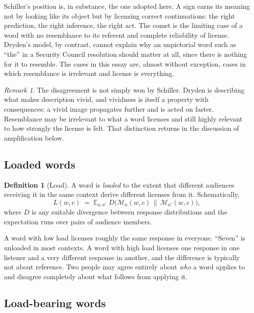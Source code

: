 \documentclass[11pt,a4paper]{article}
\theoremstyle{plain}
\theoremstyle{definition}
\newtheorem{definition}{Definition}
\theoremstyle{remark}
\newtheorem{remark}{Remark}
\newcommand{\M}{\mathcal{M}}
\begin{document}
Schiller's position is, in substance, the one adopted here. A sign earns its meaning not by looking like its object but by licensing correct continuations: the right prediction, the right inference, the right act. The comet is the limiting case of a word with no resemblance to its referent and complete reliability of license. Dryden's model, by contrast, cannot explain why an unpictorial word such as ``the'' in a Security Council resolution should matter at all, since there is nothing for it to resemble. The cases in this essay are, almost without exception, cases in which resemblance is irrelevant and license is everything.

\begin{remark}
The disagreement is not simply won by Schiller. Dryden is describing what makes description vivid, and vividness is itself a property with consequences: a vivid image propagates further and is acted on faster. Resemblance may be irrelevant to what a word licenses and still highly relevant to how strongly the license is felt. That distinction returns in the discussion of amplification below.
\end{remark}

\subsection{Loaded words}

\begin{definition}[Load]
A word is \emph{loaded} to the extent that different audiences receiving it in the same context derive different licenses from it. Schematically,
\[
L(w,c) \;=\; \mathbb{E}_{a,a'}\; D\big(\M_a(w,c)\,\big\|\,\M_{a'}(w,c)\big),
\]
where $D$ is any suitable divergence between response distributions and the expectation runs over pairs of audience members.
\end{definition}

A word with low load licenses roughly the same response in everyone. ``Seven'' is unloaded in most contexts. A word with high load licenses one response in one listener and a very different response in another, and the difference is typically not about reference. Two people may agree entirely about \emph{who} a word applies to and disagree completely about what follows from applying it.

\subsection{Load-bearing words}
\end{document}

